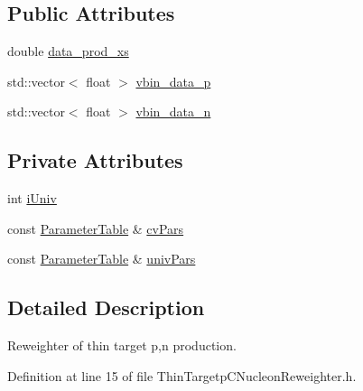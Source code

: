 \subsection*{Public Attributes}
\begin{DoxyCompactItemize}
\item 
double \hyperlink{class_neutrino_flux_reweight_1_1_thin_targetp_c_nucleon_reweighter_a42193d9c122fad580b96311a7b5e13fb}{data\-\_\-prod\-\_\-xs}
\item 
std\-::vector$<$ float $>$ \hyperlink{class_neutrino_flux_reweight_1_1_thin_targetp_c_nucleon_reweighter_affc490a2bc6f148c1eab12f3cba2457d}{vbin\-\_\-data\-\_\-p}
\item 
std\-::vector$<$ float $>$ \hyperlink{class_neutrino_flux_reweight_1_1_thin_targetp_c_nucleon_reweighter_a3ad5552b4cf05ff2f81a93f3d13432ad}{vbin\-\_\-data\-\_\-n}
\end{DoxyCompactItemize}
\subsection*{Private Attributes}
\begin{DoxyCompactItemize}
\item 
int \hyperlink{class_neutrino_flux_reweight_1_1_thin_targetp_c_nucleon_reweighter_a1c83cab529f6ce4d0f49370289bdf7f9}{i\-Univ}
\item 
const \hyperlink{class_neutrino_flux_reweight_1_1_parameter_table}{Parameter\-Table} \& \hyperlink{class_neutrino_flux_reweight_1_1_thin_targetp_c_nucleon_reweighter_ae86a08603fb33286d960ec7c87024f37}{cv\-Pars}
\item 
const \hyperlink{class_neutrino_flux_reweight_1_1_parameter_table}{Parameter\-Table} \& \hyperlink{class_neutrino_flux_reweight_1_1_thin_targetp_c_nucleon_reweighter_a46e36f7b2a8a95bd45bb748408e3bace}{univ\-Pars}
\end{DoxyCompactItemize}


\subsection{Detailed Description}
Reweighter of thin target p,n production. 

Definition at line 15 of file Thin\-Targetp\-C\-Nucleon\-Reweighter.\-h.



